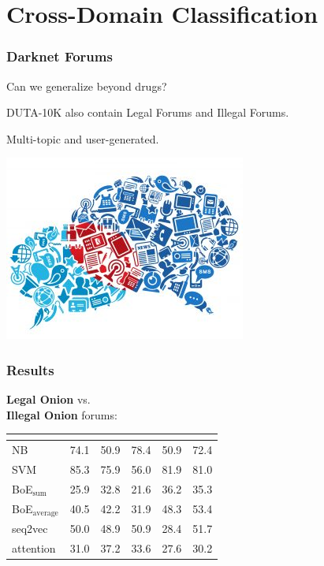 \documentclass[t,xcolor={svgnames,table},aspectratio=169]{beamer}
\begin{document}
\section{Cross-Domain Classification}

\begin{frame}
	\frametitle{Darknet Forums}
	\LARGE
	Can we generalize beyond drugs?
	\vfill
	\pause
	
	DUTA-10K also contain
	{\color{green}Legal Forums} and {\color{red}Illegal Forums}.
	
	Multi-topic and user-generated.
	\vfill
	
	\begin{center}
	\includegraphics[width=.4\textwidth]{forum.jpg}
	\end{center}
\end{frame}

\begin{frame}
	\frametitle{Results}
	
	\Large
	\textbf{\color{green} Legal Onion} vs. \\ \textbf{\color{red} Illegal Onion} forums:
	
	\vspace{-17mm}
	\begin{center}
		\setlength{\tabcolsep}{8pt}
		\begin{tabular}{l *{5}{R}}
		& 
		& 
		& 
		& 
		& \\
		\hline
		NB & 74.1 & 50.9 & 78.4 & 50.9 & 72.4\\
		SVM & 85.3 & 75.9 & 56.0 & 81.9 & 81.0\\
		BoE$_\mathrm{sum}$ & 25.9 & 32.8 & 21.6 & 36.2 & 35.3\\
		BoE$_\mathrm{average}$ & 40.5 & 42.2 & 31.9 & 48.3 & 53.4\\
		seq2vec & 50.0 & 48.9 & 50.9 & 28.4 & 51.7\\
		attention & 31.0 & 37.2 & 33.6 & 27.6 & 30.2
		\end{tabular}
	\end{center}
\end{frame}
\end{document}
